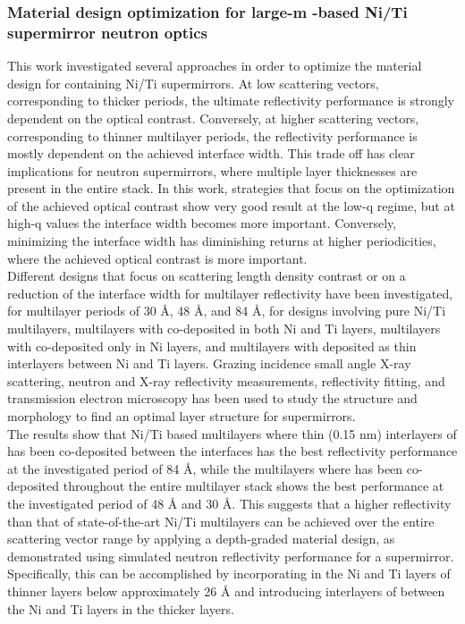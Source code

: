 \subsubsection*{Material design optimization for large-m  \BC-based Ni/Ti supermirror neutron optics}
This work investigated several approaches in order to optimize the material design for \BC containing Ni/Ti supermirrors. At low scattering vectors, corresponding to thicker periods, the ultimate reflectivity performance is strongly dependent on the optical contrast. Conversely, at higher scattering vectors, corresponding to thinner multilayer periods, the reflectivity performance is mostly dependent on the achieved interface width. This trade off has clear implications for neutron supermirrors, where multiple layer thicknesses are present in the entire stack. In this work, strategies that focus on the optimization of the achieved optical contrast show very good result at the low-q regime, but at high-q values the interface width becomes more important. Conversely, minimizing the interface width has diminishing returns at higher periodicities, where the achieved optical contrast is more important.\\
Different designs that focus on scattering length density contrast or on a reduction of the interface width for multilayer reflectivity have been investigated, for multilayer periods of 30 Å, 48 Å, and 84 Å, for designs involving pure Ni/Ti multilayers, multilayers with \BC co-deposited in both Ni and Ti layers, multilayers with \BC co-deposited only in Ni layers, and multilayers with \BC deposited as thin interlayers between Ni and Ti layers. Grazing incidence small angle X-ray scattering, neutron and X-ray reflectivity measurements, reflectivity fitting, and transmission electron microscopy has been used to study the structure and morphology to find an optimal layer structure for supermirrors. \\
The results show that Ni/Ti based multilayers where thin (0.15 nm) interlayers of \BC has been co-deposited between the interfaces has the best reflectivity performance at the investigated period of 84 Å, while the multilayers where \BC has been co-deposited throughout the entire multilayer stack shows the best performance at the investigated period of 48 Å and 30 Å. This suggests that a higher reflectivity than that of state-of-the-art Ni/Ti multilayers can be achieved over the entire scattering vector range by applying a depth-graded material design, as demonstrated using simulated neutron reflectivity performance for a supermirror. Specifically, this can be accomplished by incorporating \BC in the Ni and Ti layers of thinner layers below approximately 26 Å and introducing interlayers of \BC between the Ni and Ti layers in the thicker layers. 

